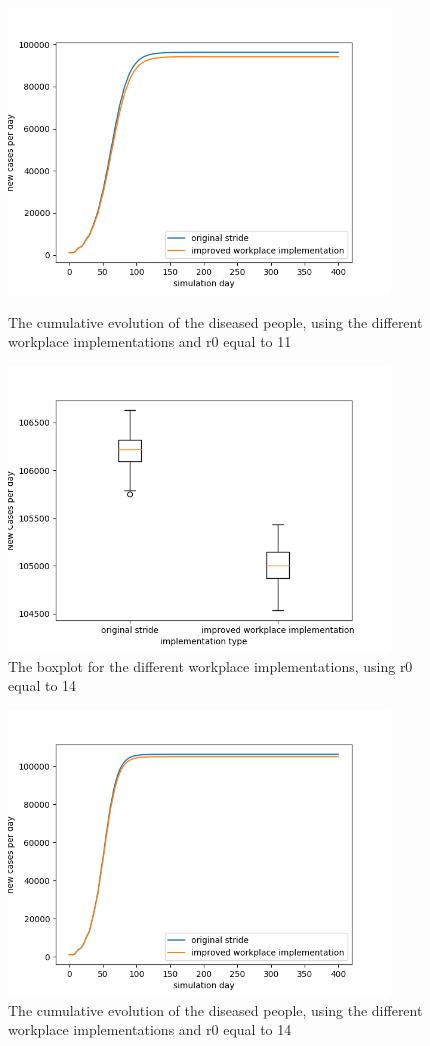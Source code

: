 \documentclass[runningheads]{llncs}
\begin{document}
	\begin{figure}
		\centering
		\includegraphics[width=0.9\textwidth]{workplace_r11_cumul.png}
		\caption{The cumulative evolution of the diseased people, using the different workplace implementations and r0 equal to 11}	
		\label{fig4}
		\includegraphics[width=0.9\textwidth]{workplace_r14_boxplot.png}	
		\caption{The boxplot for the different workplace implementations, using r0 equal to 14}
		\label{fig5}
	\end{figure}
	\begin{figure}
		\centering
		\centering
		\includegraphics[width=0.9\textwidth]{workplace_r14_cumul.png}
		\caption{The cumulative evolution of the diseased people, using the different workplace implementations and r0 equal to 14}	
		\label{fig6}
	\end{figure}
	\clearpage
\end{document}
